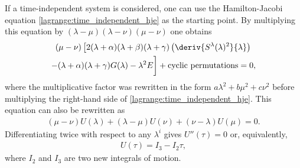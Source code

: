     If a time-independent system is considered, one can use the Hamilton-Jacobi equation \eqref{lagrange:time_independent_hje} as the starting point. By multiplying this equation by $(\lambda - \mu)(\lambda - \nu)(\mu - \nu)$ one obtains
    \begin{multline}
        (\mu - \nu)\left[2(\lambda + \alpha)(\lambda + \beta)(\lambda + \gamma)\left(\deriv{S^\lambda(\lambda)^2}{\lambda}\right)\right.\\ - (\lambda + \alpha)(\lambda + \gamma)G(\lambda) - \lambda^2E \bigg] + \text{cyclic permutations} = 0,
    \end{multline}
    where the multiplicative factor was rewritten in the form $a\lambda^2 + b\mu^2 + c\nu^2$ before multiplying the right-hand side of \eqref{lagrange:time_independent_hje}. This equation can also be rewritten as
    \begin{gather}
        (\mu-\nu)U(\lambda) + (\lambda-\mu)U(\nu) + (\nu-\lambda)U(\mu) = 0.
    \end{gather}
    Differentiating twice with respect to any $\lambda^i$ gives $U''(\tau) = 0$ or, equivalently,
    \begin{gather}
        U(\tau) = I_3 - I_2\tau,
    \end{gather}
    where $I_2$ and $I_3$ are two new integrals of motion.

